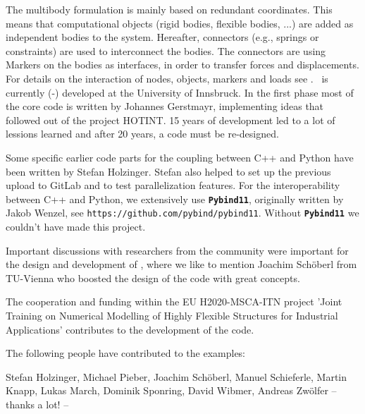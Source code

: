 The multibody formulation is mainly based on redundant coordinates. This means that computational objects (rigid bodies, flexible bodies, ...) are added as independent bodies to the system. Hereafter, connectors (e.g., springs or constraints) are used to interconnect the bodies. The connectors are using Markers on the bodies as interfaces, in order to transfer forces and displacements.
For details on the interaction of nodes, objects, markers and loads see .
%
\codeName\ is currently (\the\month-\the\year) developed at the University of Innsbruck.
In the first phase most of the core code is written by Johannes Gerstmayr, implementing ideas that followed out of the project HOTINT. 15 years of development led to a lot of lessions learned and after 20 years, a code must be re-designed.

Some specific earlier code parts for the coupling between C++ and Python have been written by Stefan Holzinger. Stefan also helped to set up the previous upload to GitLab and to test parallelization features.
For the interoperability between C++ and Python, we extensively use {\bf \texttt{Pybind11}}\cite{pybind11}, originally written by Jakob Wenzel, see \texttt{https://github.com/pybind/pybind11}. Without {\bf \texttt{Pybind11}} we couldn't have made this project.

Important discussions with researchers from the community were important for the design and development of \codeName , where we like to mention Joachim Sch{\"o}berl from TU-Vienna who boosted the design of the code with great concepts. 

The cooperation and funding within the EU H2020-MSCA-ITN project 'Joint Training on Numerical Modelling of Highly Flexible Structures for Industrial Applications' contributes to the development of the code.

The following people have contributed to the examples:
\bi
	\item Stefan Holzinger, Michael Pieber, Joachim Sch{\"o}berl, Manuel Schieferle, Martin Knapp, Lukas March, Dominik Sponring, David Wibmer, Andreas Zw{\"o}lfer
\ei
-- thanks a lot! --
%
\newpage
{}

